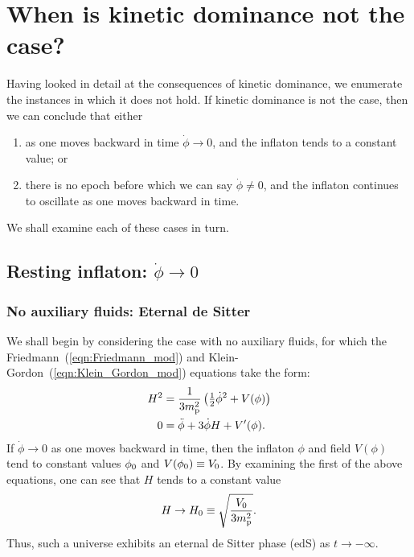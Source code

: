 \section{When is kinetic dominance not the case?}
\label{sec:When_is_kinetic_dominance_not_the_case?}
Having looked in detail at the consequences of kinetic dominance, we enumerate the instances in which it does not hold. If kinetic dominance is not the case, then we can conclude that either
%
\begin{enumerate}
    \item as one moves backward in time $\dot{\phi}\to 0$, and the inflaton tends to a constant value; or
    \item there is no epoch before which we can say $\dot{\phi}\ne 0$, and the inflaton continues to oscillate as one moves backward in time.
\end{enumerate}
%
We shall examine each of these cases in turn.

\subsection{Resting inflaton: $\dot{\phi}\to 0$}


\subsubsection{No auxiliary fluids: Eternal de Sitter}
We shall begin by considering the case with no auxiliary fluids, for which the Friedmann~(\ref{eqn:Friedmann_mod}) and Klein-Gordon~(\ref{eqn:Klein_Gordon_mod}) equations take the form:
%
\begin{align}
  H^2 
  &=
  \frac{1}{3m_{\mathrm{p}}^2}\left({\textstyle\frac{1}{2}}\dot{\phi}^2 + V(\phi) \right)
  \label{eqn:Friedmann_dotphi_to_zero_no_fluid} 
  \\
  0
  &=
  \ddot{\phi} +3\dot{\phi}H + V^\prime(\phi).
  \label{eqn:Klein_Gordon_dotphi_to_zero_no_fluid}
\end{align}
%
If $\dot{\phi}\to 0$ as one moves backward in time, then the inflaton $\phi$ and field $V(\phi)$ tend to constant values $\phi_0$ and $V(\phi_0)\equiv V_0$. By examining the first of the above equations, one can see that $H$ tends to a constant value 
%
\begin{equation}
  H\to H_0 \equiv \sqrt{\frac{V_0}{3m_{\mathrm{p}}^2}}.
\end{equation}
%
Thus, such a universe exhibits an eternal de Sitter phase (edS) as $t\to-\infty$.

